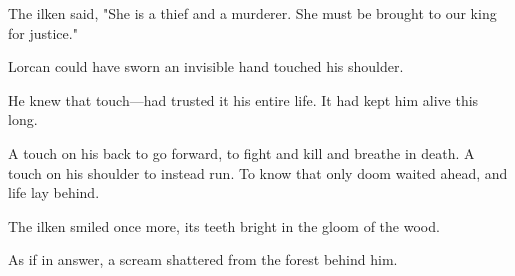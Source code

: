 The ilken said, "She is a thief and a murderer. She must be brought to our king for justice."

Lorcan could have sworn an invisible hand touched his shoulder.

He knew that touch---had trusted it his entire life. It had kept him alive this long.

A touch on his back to go forward, to fight and kill and breathe in death. A touch on his shoulder to instead run. To know that only doom waited ahead, and life lay behind.

The ilken smiled once more, its teeth bright in the gloom of the wood.

As if in answer, a scream shattered from the forest behind him.
